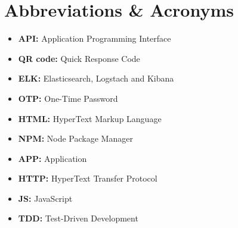 \chapter*{Abbreviations \& Acronyms}

\begin{itemize}
	\item \textbf{API:}  Application Programming Interface
	\item \textbf{QR code:} Quick Response Code
	\item \textbf{ELK:}  Elasticsearch, Logstach and Kibana
	\item \textbf{OTP:} One-Time Password
	\item \textbf{HTML:}  HyperText Markup Language
	\item \textbf{NPM:} Node Package Manager
	\item \textbf{APP:} Application
	\item \textbf{HTTP:} HyperText Transfer Protocol
	\item \textbf{JS:} JavaScript
	\item \textbf{TDD:} Test-Driven Development 
\end{itemize}